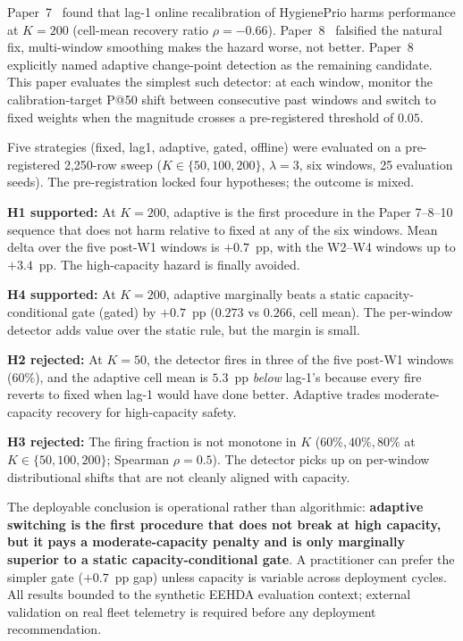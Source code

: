 Paper~7~\cite{paper7online} found that lag-1 online recalibration of
HygienePrio harms performance at $K = 200$ (cell-mean recovery ratio
$\rho = -0.66$). Paper~8~\cite{paper8multi} falsified the natural
fix, multi-window smoothing makes the hazard worse, not better.
Paper~8 explicitly named adaptive change-point detection as the
remaining candidate. This paper evaluates the simplest such
detector: at each window, monitor the calibration-target P@50 shift
between consecutive past windows and switch to fixed weights when
the magnitude crosses a pre-registered threshold of $0.05$.

Five strategies (\textsf{fixed}, \textsf{lag1}, \textsf{adaptive},
\textsf{gated}, \textsf{offline}) were evaluated on a pre-registered
2{,}250-row sweep ($K \in \{50, 100, 200\}$, $\lambda = 3$, six
windows, 25 evaluation seeds). The pre-registration locked four
hypotheses; the outcome is mixed.

\textbf{H1 supported:} At $K = 200$, \textsf{adaptive} is the first
procedure in the Paper 7--8--10 sequence that does not harm relative
to \textsf{fixed} at any of the six windows. Mean delta over the
five post-W1 windows is $+0.7$~pp, with the W2--W4 windows up to
$+3.4$~pp. The high-capacity hazard is finally avoided.

\textbf{H4 supported:} At $K = 200$, \textsf{adaptive} marginally
beats a static capacity-conditional gate (\textsf{gated}) by $+0.7$~pp
($0.273$ vs $0.266$, cell mean). The per-window detector adds value
over the static rule, but the margin is small.

\textbf{H2 rejected:} At $K = 50$, the detector fires in three of
the five post-W1 windows ($60\%$), and the adaptive cell mean is
$5.3$~pp \textit{below} lag-1's because every fire reverts to
\textsf{fixed} when lag-1 would have done better. Adaptive trades
moderate-capacity recovery for high-capacity safety.

\textbf{H3 rejected:} The firing fraction is not monotone in $K$
($60\%, 40\%, 80\%$ at $K \in \{50, 100, 200\}$; Spearman
$\rho = 0.5$). The detector picks up on per-window distributional
shifts that are not cleanly aligned with capacity.

The deployable conclusion is operational rather than algorithmic:
\textbf{adaptive switching is the first procedure that does not
break at high capacity, but it pays a moderate-capacity penalty
and is only marginally superior to a static capacity-conditional
gate}. A practitioner can prefer the simpler gate ($+0.7$~pp gap)
unless capacity is variable across deployment cycles. All results
bounded to the synthetic EEHDA evaluation context; external validation
on real fleet telemetry is required before any deployment recommendation.
